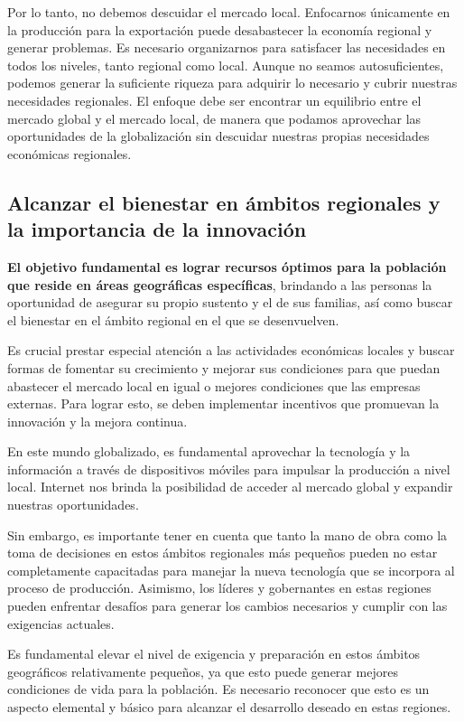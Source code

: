 \documentclass[
  a4paper,
]{article}
\begin{document}
Por lo tanto, no debemos descuidar el mercado local. Enfocarnos
únicamente en la producción para la exportación puede desabastecer la
economía regional y generar problemas. Es necesario organizarnos para
satisfacer las necesidades en todos los niveles, tanto regional como
local. Aunque no seamos autosuficientes, podemos generar la suficiente
riqueza para adquirir lo necesario y cubrir nuestras necesidades
regionales. El enfoque debe ser encontrar un equilibrio entre el mercado
global y el mercado local, de manera que podamos aprovechar las
oportunidades de la globalización sin descuidar nuestras propias
necesidades económicas regionales.

\subsection{Alcanzar el bienestar en ámbitos regionales y la importancia
de la
innovación}\label{alcanzar-el-bienestar-en-uxe1mbitos-regionales-y-la-importancia-de-la-innovaciuxf3n}

\textbf{El objetivo fundamental es lograr recursos óptimos para la
población que reside en áreas geográficas específicas}, brindando a las
personas la oportunidad de asegurar su propio sustento y el de sus
familias, así como buscar el bienestar en el ámbito regional en el que
se desenvuelven.

Es crucial prestar especial atención a las actividades económicas
locales y buscar formas de fomentar su crecimiento y mejorar sus
condiciones para que puedan abastecer el mercado local en igual o
mejores condiciones que las empresas externas. Para lograr esto, se
deben implementar incentivos que promuevan la innovación y la mejora
continua.

En este mundo globalizado, es fundamental aprovechar la tecnología y la
información a través de dispositivos móviles para impulsar la producción
a nivel local. Internet nos brinda la posibilidad de acceder al mercado
global y expandir nuestras oportunidades.

Sin embargo, es importante tener en cuenta que tanto la mano de obra
como la toma de decisiones en estos ámbitos regionales más pequeños
pueden no estar completamente capacitadas para manejar la nueva
tecnología que se incorpora al proceso de producción. Asimismo, los
líderes y gobernantes en estas regiones pueden enfrentar desafíos para
generar los cambios necesarios y cumplir con las exigencias actuales.

Es fundamental elevar el nivel de exigencia y preparación en estos
ámbitos geográficos relativamente pequeños, ya que esto puede generar
mejores condiciones de vida para la población. Es necesario reconocer
que esto es un aspecto elemental y básico para alcanzar el desarrollo
deseado en estas regiones.
\end{document}
